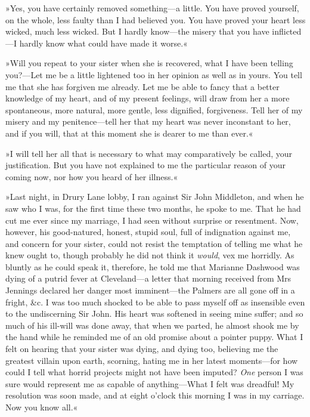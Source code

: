 »Yes, you have certainly removed something—a little. You have proved yourself, on the whole, less faulty than I had believed you. You have proved your heart less wicked, much less wicked. But I hardly know—the misery that you have inflicted—I hardly know what could have made it worse.«

»Will you repeat to your sister when she is recovered, what I have been telling you?—Let me be a little lightened too in her opinion as well as in yours. You tell me that she has forgiven me already. Let me be able to fancy that a better knowledge of my heart, and of my present feelings, will draw from her a more spontaneous, more natural, more gentle, less dignified, forgiveness. Tell her of my misery and my penitence—tell her that my heart was never inconstant to her, and if you will, that at this moment she is dearer to me than ever.«

»I will tell her all that is necessary to what may comparatively be called, your justification. But you have not explained to me the particular reason of your coming now, nor how you heard of her illness.«

»Last night, in Drury Lane lobby, I ran against Sir John Middleton, and when he saw who I was, for the first time these two months, he spoke to me. That he had cut me ever since my marriage, I had seen without surprise or resentment. Now, however, his good-natured, honest, stupid soul, full of indignation against me, and concern for your sister, could not resist the temptation of telling me what he knew ought to, though probably he did not think it \textit{would}, vex me horridly. As bluntly as he could speak it, therefore, he told me that Marianne Dashwood was dying of a putrid fever at Cleveland—a letter that morning received from Mrs Jennings declared her danger most imminent—the Palmers are all gone off in a fright, \&c. I was too much shocked to be able to pass myself off as insensible even to the undiscerning Sir John. His heart was softened in seeing mine suffer; and so much of his ill-will was done away, that when we parted, he almost shook me by the hand while he reminded me of an old promise about a pointer puppy. What I felt on hearing that your sister was dying, and dying too, believing me the greatest villain upon earth, scorning, hating me in her latest moments—for how could I tell what horrid projects might not have been imputed? \textit{One} person I was sure would represent me as capable of anything—What I felt was dreadful! My resolution was soon made, and at eight o’clock this morning I was in my carriage. Now you know all.«


